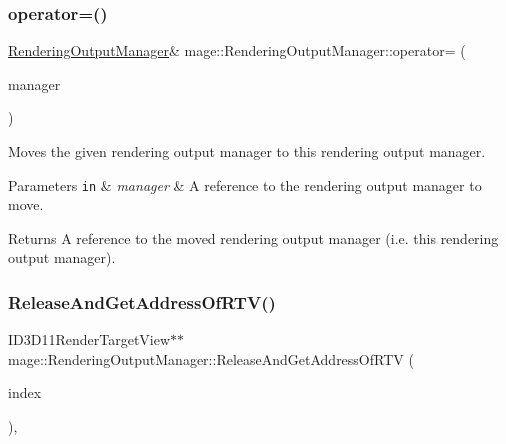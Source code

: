 \subsubsection{\texorpdfstring{operator=()}{operator=()}\hspace{0.1cm}{\footnotesize\ttfamily [2/2]}}
{\footnotesize\ttfamily \hyperlink{classmage_1_1_rendering_output_manager}{Rendering\+Output\+Manager}\& mage\+::\+Rendering\+Output\+Manager\+::operator= (\begin{DoxyParamCaption}\item[{\hyperlink{classmage_1_1_rendering_output_manager}{Rendering\+Output\+Manager} \&\&}]{manager }\end{DoxyParamCaption})\hspace{0.3cm}{\ttfamily [delete]}}

Moves the given rendering output manager to this rendering output manager.


\begin{DoxyParams}[1]{Parameters}
\mbox{\tt in}  & {\em manager} & A reference to the rendering output manager to move. \\
\hline
\end{DoxyParams}
\begin{DoxyReturn}{Returns}
A reference to the moved rendering output manager (i.\+e. this rendering output manager). 
\end{DoxyReturn}
\hypertarget{classmage_1_1_rendering_output_manager_a1b8102ba96cdab743499da051ca4fa3f}{}\label{classmage_1_1_rendering_output_manager_a1b8102ba96cdab743499da051ca4fa3f} 
\subsubsection{\texorpdfstring{Release\+And\+Get\+Address\+Of\+R\+T\+V()}{ReleaseAndGetAddressOfRTV()}}
{\footnotesize\ttfamily I\+D3\+D11\+Render\+Target\+View$\ast$$\ast$ mage\+::\+Rendering\+Output\+Manager\+::\+Release\+And\+Get\+Address\+Of\+R\+TV (\begin{DoxyParamCaption}\item[{\hyperlink{classmage_1_1_rendering_output_manager_a776a03191e0a424d8e014414d9d44cef}{R\+T\+V\+Index}}]{index }\end{DoxyParamCaption})\hspace{0.3cm}{\ttfamily [private]}, {\ttfamily [noexcept]}}

